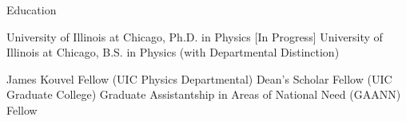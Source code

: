 \begin{rubric}{Education}


  \entry*[2005 --- \ldots] University of Illinois at Chicago, Ph.D. in Physics [In Progress]
  \entry*[2002 --- 2005] University of Illinois at Chicago, B.S. in Physics (with Departmental Distinction)
  

  \entry*[2011 --- 2012] James Kouvel Fellow (UIC Physics Departmental)
  \entry*[2011 --- 2012] Dean's Scholar Fellow (UIC Graduate College)
  \entry*[2007 --- 2010] Graduate Assistantship in Areas of National Need (GAANN) Fellow

\end{rubric}
